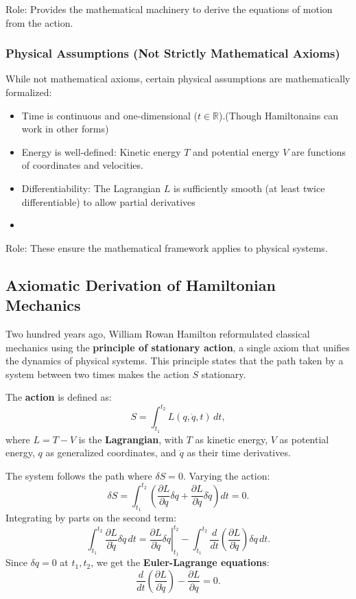 Role: Provides the mathematical machinery to derive the equations of motion from the action.

\subsubsection{Physical Assumptions (Not Strictly Mathematical Axioms)}
While not mathematical axioms, certain physical assumptions are mathematically formalized:
\begin{itemize}
    \item Time is continuous and one-dimensional ($ t \in \mathbb{R} $).(Though Hamiltonains can work in other forms)
    \item Energy is well-defined: Kinetic energy $ T $ and potential energy $ V $ are functions of coordinates and velocities.
    \item Differentiability: The Lagrangian $ L $ is sufficiently smooth (at least twice differentiable) to allow partial derivatives
    \item 

\end{itemize}
Role: These ensure the mathematical framework applies to physical systems.
\subsection{Axiomatic Derivation of Hamiltonian Mechanics}
Two hundred years ago, William Rowan Hamilton reformulated classical mechanics using the \textbf{principle of stationary action}, a single axiom that unifies the dynamics of physical systems. This principle states that the path taken by a system between two times makes the action \( S \) stationary.

The \textbf{action} is defined as:
\[
S = \int_{t_1}^{t_2} L(q, \dot{q}, t) \, dt,
\]
where \( L = T - V \) is the \textbf{Lagrangian}, with \( T \) as kinetic energy, \( V \) as potential energy, \( q \) as generalized coordinates, and \( \dot{q} \) as their time derivatives.

The system follows the path where \( \delta S = 0 \). Varying the action:
\[
\delta S = \int_{t_1}^{t_2} \left( \frac{\partial L}{\partial q} \delta q + \frac{\partial L}{\partial \dot{q}} \delta \dot{q} \right) dt = 0.
\]
Integrating by parts on the second term:
\[
\int_{t_1}^{t_2} \frac{\partial L}{\partial \dot{q}} \delta \dot{q} \, dt = \left. \frac{\partial L}{\partial \dot{q}} \delta q \right|_{t_1}^{t_2} - \int_{t_1}^{t_2} \frac{d}{dt} \left( \frac{\partial L}{\partial \dot{q}} \right) \delta q \, dt.
\]
Since \( \delta q = 0 \) at \( t_1, t_2 \), we get the \textbf{Euler-Lagrange equations}:
\[
\frac{d}{dt} \left( \frac{\partial L}{\partial \dot{q}} \right) - \frac{\partial L}{\partial q} = 0.
\]

